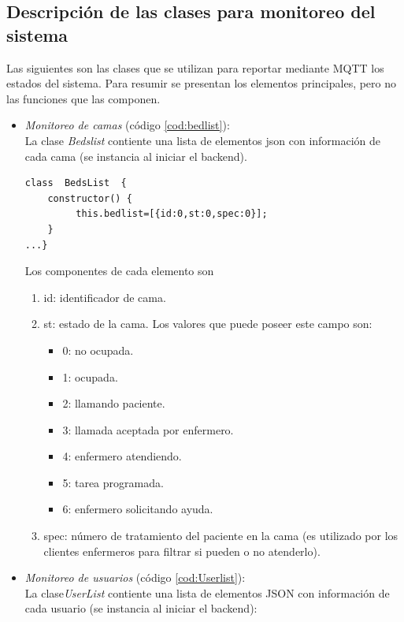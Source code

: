 \pagebreak
\subsection{Descripción de las clases para monitoreo del sistema}

Las siguientes son las clases que se utilizan para reportar mediante MQTT los estados del sistema. Para resumir se presentan los elementos principales, pero no las funciones que las componen.

\begin{itemize}

\item \textit{ Monitoreo de camas} (código \ref{cod:bedlist}):\\
La clase \textit{Bedslist} contiente una lista de elementos json con información de cada cama (se instancia al iniciar el backend).

\begin{lstlisting}[label=cod:bedlist,caption=  Clase Bedlist]
class  BedsList  {    
    constructor() {
         this.bedlist=[{id:0,st:0,spec:0}];                        
    }
...}
\end{lstlisting}

Los componentes de cada elemento son 
\begin{enumerate}
\item id: identificador de cama.
\item st: estado de la cama. Los valores que puede poseer este campo son: 
\begin{itemize}
\item 0: no ocupada.
\item 1: ocupada.
\item 2: llamando paciente.
\item 3: llamada aceptada por enfermero.
\item 4: enfermero atendiendo.
\item 5: tarea programada.
\item 6: enfermero solicitando ayuda.
\end{itemize}
\item spec: número de tratamiento del paciente en la cama (es utilizado por los clientes enfermeros para filtrar si pueden o no atenderlo).
\end{enumerate}


\item \textit{ Monitoreo de usuarios} (código \ref{cod:Userlist}):\\
La clase\textit{UserList} contiente una lista de elementos JSON con información de cada usuario (se instancia al iniciar el backend):


\end{itemize}
